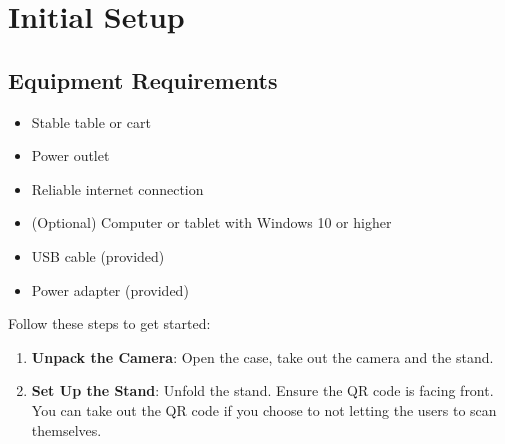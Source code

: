 \documentclass[
  Letterpaper,
]{scrbook}
\providecommand{\tightlist}{%
  \setlength{\itemsep}{0pt}\setlength{\parskip}{0pt}}\usepackage{longtable,booktabs,array}
\begin{document}
\section{Initial Setup}\label{initial-setup}

\subsection{Equipment Requirements}\label{equipment-requirements}

\begin{itemize}
\tightlist
\item
  Stable table or cart
\item
  Power outlet
\item
  Reliable internet connection
\item
  (Optional) Computer or tablet with Windows 10 or higher
\item
  USB cable (provided)
\item
  Power adapter (provided)
\end{itemize}

Follow these steps to get started:

\begin{enumerate}
\def\labelenumi{\arabic{enumi}.}
\item
  \textbf{Unpack the Camera}: Open the case, take out the camera and the
  stand.
\item
  \textbf{Set Up the Stand}: Unfold the stand. Ensure the QR code is
  facing front. You can take out the QR code if you choose to not
  letting the users to scan themselves.
\end{enumerate}
\end{document}

